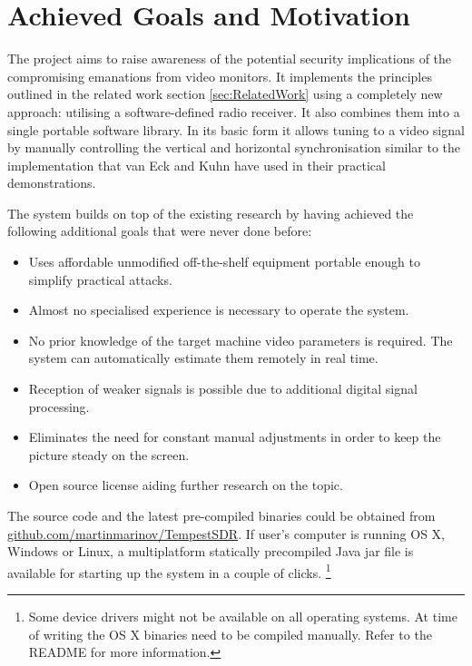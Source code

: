 \documentclass[a4paper,12pt,twoside,openright]{report}
\begin{document}
\section{Achieved Goals and Motivation}

The project aims to raise awareness of the potential security implications of the compromising emanations from video monitors. It implements the principles outlined in the related work section \ref{sec:RelatedWork} using a completely new approach: utilising a software-defined radio receiver. It also combines them into a single portable software library. In its basic form it allows tuning to a video signal by manually controlling the vertical and horizontal synchronisation similar to the implementation that van Eck and Kuhn have used in their practical demonstrations.

The system builds on top of the existing research by having achieved the following additional goals that were never done before:

\begin{itemize}

  \item Uses affordable unmodified off-the-shelf equipment portable enough to simplify practical attacks.
  \item Almost no specialised experience is necessary to operate the system.
  \item No prior knowledge of the target machine video parameters is required. The system can automatically estimate them remotely in real time.
  \item Reception of weaker signals is possible due to additional digital signal processing.
  \item Eliminates the need for constant manual adjustments in order to keep the picture steady on the screen.
  \item Open source license aiding further research on the topic.

\end{itemize}

The source code and the latest pre-compiled binaries could be obtained from \href{https://github.com/martinmarinov/TempestSDR}{github.com/martinmarinov/TempestSDR}. If user's computer is running OS X, Windows or Linux, a multiplatform statically precompiled Java jar file is available for starting up the system in a couple of clicks.
\footnote{Some device drivers might not be available on all operating systems. At time of writing the OS X binaries need to be compiled manually. Refer to the README for more information.}
\end{document}
